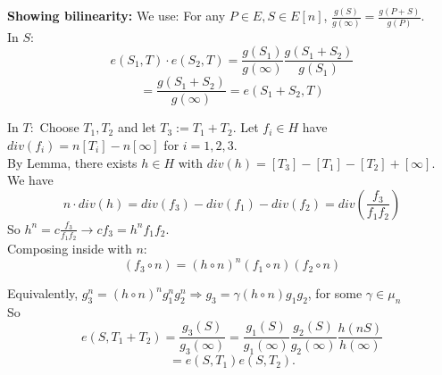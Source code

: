 \documentclass[shadesubsections,compress,14pt,mathserif]{beamer}
\newcommand{\defeq}{\ensuremath{:=}}
\newcommand{\nl}{\\ \pause \vspace{0.2in}}
\begin{document}
\begin{frame}
 \textbf{Showing bilinearity:}
We use: For any $P\in E, S\in E[n]$, $\frac{g(S)}{g(\infty)}=\frac{g(P+S)}{g(P)}$. \nl
In $S:$
$$ e(S_1,T)\cdot e(S_2,T) = \frac{g(S_1)}{g(\infty)}\frac{g(S_1+S_2)}{g(S_1)}$$\pause
$$= \frac{g(S_1+S_2)}{g(\infty)}= e(S_1+S_2,T)$$\pause

\end{frame}
\begin{frame}
 In $T:$
 Choose $T_1,T_2$ and let $T_3\defeq T_1+T_2$. Let $f_i\in H$ have $div(f_i) = n[T_i]-n[\infty]$
 for $i=1,2,3$.\nl
 By Lemma, there exists $h\in H$ with $div(h)=[T_3]-[T_1]-[T_2]+[\infty]$.\nl
 We have
 $$n\cdot div(h) = div(f_3)-div(f_1)-div(f_2) = div\left(\frac{f_3}{f_1 f_2}\right)$$\pause
 So $h^n = c \frac{f_3}{f_1 f_2} \rightarrow c f_3=h^n f_1 f_2$.\nl
 Composing inside with $n$:
 $$(f_3\circ n) = (h\circ n )^n (f_1\circ n) (f_2 \circ n)$$\pause
 
\end{frame}
\begin{frame}
 Equivalently, $g_3^n = (h\circ n)^n g_1 ^n g_2^n \Rightarrow g_3 = \gamma (h \circ n) g_1 g_2$,
 for some $\gamma\in \mu_n$\nl
 So 
 $$e(S,T_1+T_2) = \frac{g_3(S)}{g_3(\infty)}= \frac{g_1(S)}{g_1(\infty)}\frac{g_2(S)}{g_2(\infty)}\frac{h(nS)}{h(\infty)}$$\pause
 $$=e(S,T_1)e(S,T_2).$$
\end{frame}
\end{document}

